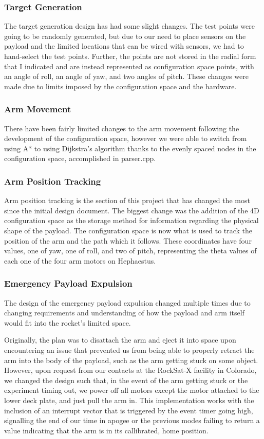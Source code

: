 \subsubsection{Target Generation}
The target generation design has had some slight changes. The test points were going to be 
randomly generated, but due to our need to place sensors on the payload and the limited locations
that can be wired with sensors, we had to hand-select the test points. Further, the points are 
not stored in the radial form that I indicated and are instead represented as configuration space
 points, with an angle of roll, an angle of yaw, and two angles of pitch. These changes were made
due to limits imposed by the configuration space and the hardware.

\subsubsection{Arm Movement}
There have been fairly limited changes to the arm movement following the development of the 
configuration space, however we were able to switch from using A* to using Dijkstra's algorithm 
thanks to the evenly spaced nodes in the configuration space, accomplished in parser.cpp.

\subsubsection{Arm Position Tracking}
Arm position tracking is the section of this project that has changed the most since the initial 
design document. The biggest change was the addition of the 4D configuration space as the storage 
method for information regarding the physical shape of the payload. The configuration space is now 
what is used to track the position of the arm and the path which it follows. These coordinates have 
four values, one of yaw, one of roll, and two of pitch, representing the theta values of each one of 
the four arm motors on Hephaestus.

\subsubsection{Emergency Payload Expulsion}
The design of the emergency payload expulsion changed multiple times due to
changing requirements and understanding of how the \gls{payload} and arm itself would fit into the rocket's limited space.

Originally, the plan was to disattach the arm and eject it into space upon
encountering an issue that prevented us from being able to properly retract the arm into the body of the payload,
such as the arm getting stuck on some object. However, upon request from our contacts at the RockSat-X facility in 
Colorado, we changed the design such that, in the event of the arm getting stuck or the experiment timing out, 
we power off all motors except the motor attached to the lower deck plate, and just pull the arm in. This
implementation works with the inclusion of an interrupt vector that is triggered by the event timer
going high, signalling the end of our time in apogee or the previous modes failing to return a value indicating
that the arm is in its callibrated, home position.

